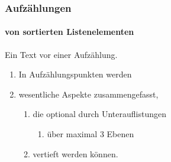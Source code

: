 \begin{frame}
    \frametitle{Aufz\"ahlungen}
    \framesubtitle{von sortierten Listenelementen}

    Ein Text vor einer Aufz\"ahlung.
    \begin{enumerate}
        \item In Aufz\"ahlungspunkten werden
        \item wesentliche Aspekte zusammengefasst,
        \begin{enumerate}
            \item die optional durch Unterauflistungen
            \begin{enumerate}
                \item über maximal 3 Ebenen
            \end{enumerate}
          \item vertieft werden k\"onnen.
        \end{enumerate}
    \end{enumerate}
\end{frame}